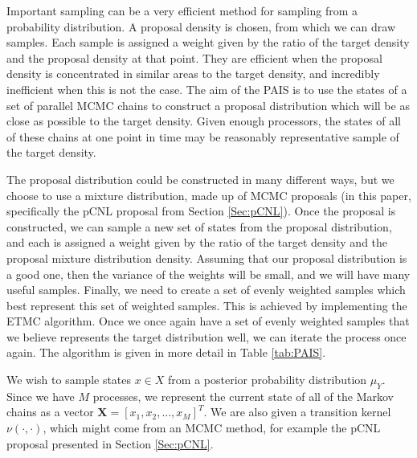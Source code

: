 \documentclass[final]{siamltex}
\newcommand{\X}{{\mathbf X}}
\begin{document}

Important sampling can be a very efficient method for sampling from a
probability distribution. A proposal density is chosen, from which we
can draw samples. Each sample is assigned a weight given by the
ratio of the target density and the proposal density at that
point. They are efficient when the proposal density is concentrated in
similar areas to the target density, and incredibly inefficient when
this is not the case. The aim of the PAIS is to use the states of a
set of parallel MCMC chains to construct a proposal distribution which
will be as close as possible to the target density. Given enough
processors, the states of all of these chains at one point
in time may be reasonably representative sample of the target density.

The proposal distribution could be constructed in many different ways,
but we choose to use a mixture distribution, made up of MCMC proposals
(in this paper, specifically the pCNL proposal from Section \ref{Sec:pCNL}). Once the proposal is
constructed, we can sample a new set of states from the proposal
distribution, and each is assigned a weight given by the ratio of the target
density and the proposal mixture distribution density. Assuming that
our proposal distribution is a good one, then the variance of the
weights will be small, and we will have many useful samples. Finally, we
need to create a set of evenly weighted samples which best represent
this set of weighted samples. This is achieved by implementing the
ETMC algorithm. Once we once again have a set of evenly weighted
samples that we believe represents the target distribution well, we
can iterate the process once again. The algorithm is given in more detail in Table \ref{tab:PAIS}. 

We wish to sample states $x \in X$ from a posterior
probability distribution $\mu_Y$. Since we have $M$ processes, we
represent the current state of all of the Markov chains as a vector
$\X = [x_1,x_2,\ldots,x_M]^T$. We are also given a transition kernel
$\nu(\cdot,\cdot)$, which might come from an MCMC method, for example
the pCNL proposal presented in Section \ref{Sec:pCNL}.
\end{document}
